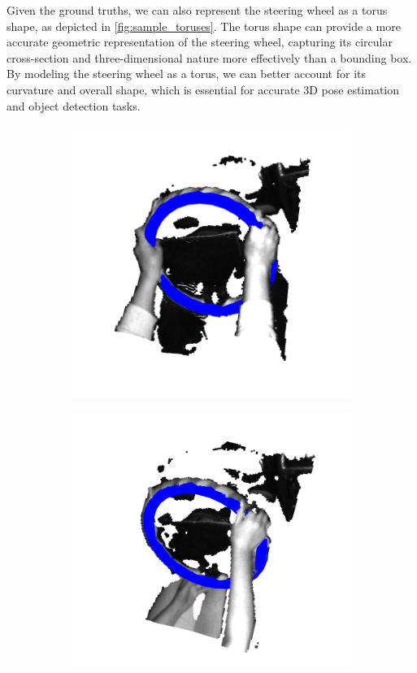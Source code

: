 Given the ground truths, we can also represent the steering wheel 
as a torus shape, as depicted in \cref{fig:sample_toruses}. 
The torus shape can provide a more accurate geometric 
representation of the steering wheel, capturing its circular 
cross-section and three-dimensional nature more effectively 
than a bounding box. By modeling the steering wheel as a 
torus, we can better account for its curvature and overall 
shape, which is essential for accurate 3D pose estimation and 
object detection tasks.


\begin{figure}[ht]
    \centering
    \begin{subfigure}[t]{0.3\textwidth}
        \centering
        \includegraphics[width=\textwidth]{media/chapter 3/torus1.png}
    \end{subfigure}\hfill
    \begin{subfigure}[t]{0.3\textwidth}
        \centering
        \includegraphics[width=\textwidth]{media/chapter 3/torus2.png}

\end{subfigure}
\end{figure}
